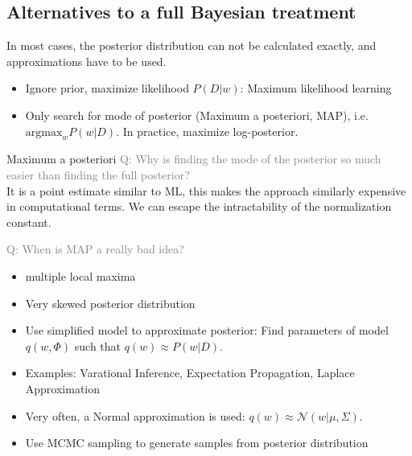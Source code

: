 \subsection{Alternatives to a full Bayesian treatment}
In most cases, the posterior distribution can not be calculated exactly, and approximations have to be used.
\begin{itemize}
\item Ignore prior, maximize likelihood $P(D|w)$: {Maximum likelihood learning}
\item Only search for mode of posterior ({Maximum a posteriori, MAP}), i.e. $\mbox{argmax}_w P(w |D) $. In practice, maximize log-posterior.\\
\end{itemize}

\begin{bbbox}{Maximum a posteriori}
\textcolor{gray}{Q: Why is finding the mode of the posterior so much easier than finding the full posterior?}\\
It is a point estimate similar to ML, this makes the approach similarly expensive in computational terms.
We can escape the intractability of the normalization constant.

\textcolor{gray}{Q: When is MAP a really bad idea?}
\begin{itemize}
	\item multiple local maxima
	\item Very skewed posterior distribution
\end{itemize} 
\end{bbbox}

\begin{itemize}
\item Use simplified model to approximate posterior: Find parameters of model $q(w,\Phi)$ such that
$q(w) \approx P(w|D)$. \\

\item Examples: Varational Inference, Expectation Propagation, Laplace Approximation
\item Very often, a Normal approximation is used: $q(w) \approx \mathcal{N}(w|\mu,\Sigma)$.
\item Use MCMC sampling to generate samples from posterior distribution
\end{itemize}

		

